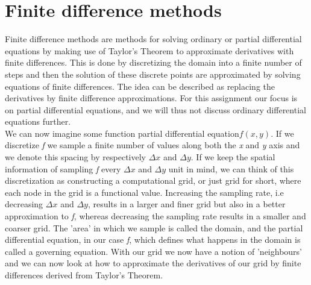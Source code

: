 \section{Finite difference methods}
Finite difference methods are methods for solving ordinary or partial differential equations by making use of Taylor's Theorem to approximate derivatives with finite differences. This is done by discretizing the domain into a finite number of steps and then the solution of these discrete points are approximated by solving equations of finite differences. The idea can be described as replacing the derivatives by finite difference approximations. For this assignment our focus is on partial differential equations, and we will thus not discuss ordinary differential equations further. \\
We can now imagine some function partial differential equation$f(x,y)$. If we discretize \textit{f} we sample a finite number of values along both the \textit{x} and \textit{y} axis and we denote this spacing by respectively $\Delta x$ and $\Delta y$. If we keep the spatial information of sampling \textit{f} every $\Delta x$ and $\Delta y$ unit in mind, we can think of this discretization as constructing a computational grid, or just grid for short, where each node in the grid is a functional value. Increasing the sampling rate, i.e decreasing $\Delta x$ and $\Delta y$, results in a larger and finer grid but also in a better approximation to \textit{f}, whereas decreasing the sampling rate results in a smaller and coarser grid. The 'area' in which we sample is called the domain, and the partial differential equation, in our case \textit{f}, which defines what happens in the domain is called a governing equation. With our grid we now have a notion of 'neighbours' and we can now look at how to approximate the derivatives of our grid by finite differences derived from Taylor's Theorem.

